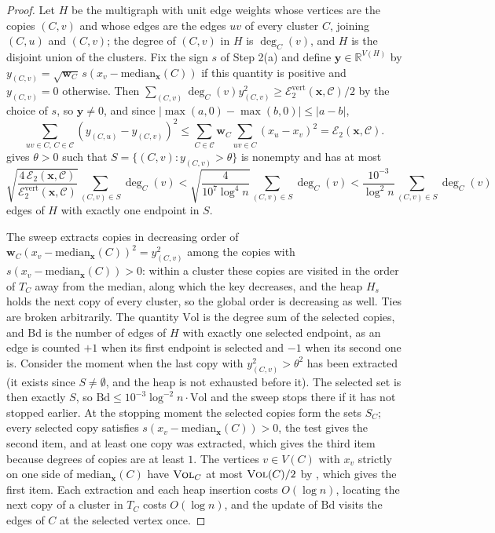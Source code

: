 \documentclass[11pt]{article}
\theoremstyle{remark}
\newcommand{\ww}{\mathbf w}
\newcommand{\xx}{\mathbf x}
\newcommand{\yy}{\mathbf y}
\newcommand{\Ccal}{\mathcal{C}}
\newcommand{\Ecal}[1]{\mathcal E_{#1}}
\newcommand{\Ecalvert}[1]{\mathcal{E}^{\mathrm{vert}}_{#1}}
\newcommand{\R}{\mathbb R}
\newcommand{\vol}{\textsc{Vol}}
\begin{document}
\begin{proof}
Let $H$ be the multigraph with unit edge weights whose vertices are the
copies $(C, v)$ and whose edges are the edges $uv$ of every cluster $C$,
joining $(C, u)$ and $(C, v)$; the degree of $(C, v)$ in $H$ is $\deg_C(v)$,
and $H$ is the disjoint union of the clusters.
Fix the sign $s$ of Step 2(a) and define $\yy \in \R^{V(H)}$ by
$y_{(C, v)} = \sqrt{\ww_C} \, s (x_v - \mathrm{median}_{\xx}(C))$ if this
quantity is positive and $y_{(C, v)} = 0$ otherwise.
Then $\sum_{(C, v)} \deg_C(v) y_{(C, v)}^{2} \ge \Ecalvert{2}(\xx, \Ccal)/2$
by the choice of $s$, so $\yy \ne 0$, and since
$|\max(a, 0) - \max(b, 0)| \le |a - b|$,
\[
\sum_{uv \in C,\, C \in \Ccal} \left( y_{(C, u)} - y_{(C, v)} \right)^{2}
\le \sum_{C \in \Ccal} \ww_C \sum_{uv \in C} (x_u - x_v)^{2}
= \Ecal{2}(\xx, \Ccal) .
\]
 gives $\theta > 0$ such that
$S = \{ (C, v) : y_{(C, v)} > \theta \}$ is nonempty and has at most
\[
\sqrt{ \frac{ 4 \, \Ecal{2}(\xx, \Ccal) }{ \Ecalvert{2}(\xx, \Ccal) } }
\sum_{(C, v) \in S} \deg_C(v)
< \sqrt{ \frac{4}{10^{7} \log^{4} n} } \sum_{(C, v) \in S} \deg_C(v)
< \frac{10^{-3}}{\log^{2} n} \sum_{(C, v) \in S} \deg_C(v)
\]
edges of $H$ with exactly one endpoint in $S$.

The sweep extracts copies in decreasing order of
$\ww_C (x_v - \mathrm{median}_{\xx}(C))^{2} = y_{(C, v)}^{2}$ among the copies
with $s(x_v - \mathrm{median}_{\xx}(C)) > 0$: within a cluster these copies
are visited in the order of $T_C$ away from the median, along which the key
decreases, and the heap $H_s$ holds the next copy of every cluster, so the
global order is decreasing as well.
Ties are broken arbitrarily.
The quantity $\mathrm{Vol}$ is the degree sum of the selected copies, and
$\mathrm{Bd}$ is the number of edges of $H$ with exactly one selected
endpoint, as an edge is counted $+1$ when its first endpoint is selected and
$-1$ when its second one is.
Consider the moment when the last copy with $y_{(C, v)}^{2} > \theta^{2}$
has been extracted (it exists since $S \ne \emptyset$, and the heap is not
exhausted before it).
The selected set is then exactly $S$, so $\mathrm{Bd} \le 10^{-3} \log^{-2} n
\cdot \mathrm{Vol}$ and the sweep stops there if it has not stopped earlier.
At the stopping moment the selected copies form the sets $S_C$; every
selected copy satisfies $s(x_v - \mathrm{median}_{\xx}(C)) > 0$, the test
gives the second item, and at least one copy was extracted, which gives the
third item because degrees of copies are at least $1$.
The vertices $v \in V(C)$ with $x_v$ strictly on one side of
$\mathrm{median}_{\xx}(C)$ have $\vol_C$ at most $\vol(C)/2$ by
, which gives the first item.
Each extraction and each heap insertion costs $O(\log n)$, locating the next
copy of a cluster in $T_C$ costs $O(\log n)$, and the update of
$\mathrm{Bd}$ visits the edges of $C$ at the selected vertex once.
\end{proof}
\end{document}
